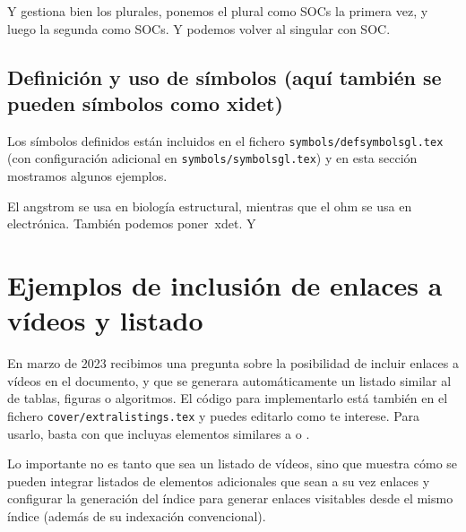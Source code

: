Y gestiona bien los plurales, ponemos el plural como \acp{SOC} la primera vez, y luego la segunda como \acp{SOC}. Y podemos volver al singular con \ac{SOC}.


\subsection{Definición y uso de símbolos (aquí también se pueden símbolos como \ac{xidet})}
\label{sec:simbolos}

Los símbolos definidos están incluidos en el fichero \texttt{symbols/defsymbolsgl.tex} (con configuración adicional en \texttt{symbols/symbolsgl.tex}) y en esta sección mostramos algunos ejemplos.

El \ac{angstrom} se usa en biología estructural, mientras que el \ac{ohm} se usa en electrónica. También podemos poner~\ac{xdet}. Y


\section{Ejemplos de inclusión de enlaces a vídeos y listado}
\label{sec:videolink}

En marzo de 2023 recibimos una pregunta sobre la posibilidad de incluir enlaces a vídeos en el documento, y que se generara automáticamente un listado similar al de tablas, figuras o algoritmos. El código para implementarlo está también en el fichero \texttt{cover/extralistings.tex} y puedes editarlo como te interese. Para usarlo, basta con que incluyas elementos similares a  o .

Lo importante no es tanto que sea un listado de vídeos, sino que muestra cómo se pueden integrar listados de elementos adicionales que sean a su vez enlaces y configurar la generación del índice para generar enlaces visitables desde el mismo índice (además de su indexación convencional).



